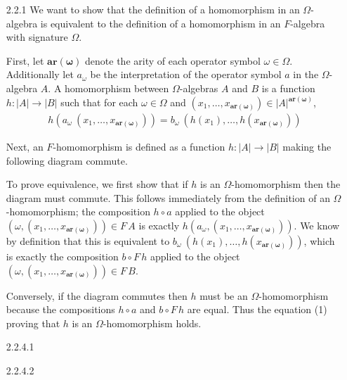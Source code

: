 \documentclass{article}
\newcommand{\carrier}[1]{|#1|}
\newcommand{\ar}[1]{\mathbf{ar(#1)}}
\begin{document}
\begin{enumerate}
\item [2.2.1]
  We want to show that the definition of a homomorphism in an $\Omega$-algebra is equivalent to the definition of a homomorphism in an $F$-algebra with signature $\Omega$.
  
  First, let $\ar{\omega}$ denote the arity of each operator symbol $\omega \in \Omega$.
  Additionally let $a_\omega$ be the interpretation of the operator symbol $a$ in the $\Omega$-algebra $A$.
  A homomorphism between $\Omega$-algebras $A$ and $B$ is a function $h : \carrier{A} \rightarrow \carrier{B}$ such that for each $\omega \in \Omega$ and $(x_1,\ldots,x_{\ar{\omega}}) \in \carrier{A}^{\ar{\omega}}$,
  \begin{align}
    h(a_\omega~(x_1,\ldots,x_{\ar{\omega}})) = b_\omega~(h(x_1),\ldots,h(x_{\ar{\omega}}))
  \end{align}

  Next, an $F$-homomorphism is defined as a function $h : \carrier{A} \rightarrow\carrier{B}$ making the following diagram commute.
  \begin{center}
  \end{center}

  To prove equivalence, we first show that if $h$ is an $\Omega$-homomorphism then the diagram must commute.
  This follows immediately from the definition of an $\Omega$-homomorphism; the composition $h \circ a$ applied to the object $(\omega, (x_1,\ldots,x_{\ar{\omega}})) \in F\,A$ is exactly $h(a_\omega, (x_1,\ldots,x_{\ar{\omega}}))$.
  We know by definition that this is equivalent to $b_\omega~(h(x_1),\ldots,h(x_{\ar{\omega}}))$, which is exactly the composition $b \circ F\,h$ applied to the object $(\omega, (x_1,\ldots,x_{\ar{\omega}})) \in F\,B$.

  Conversely, if the diagram commutes then $h$ must be an $\Omega$-homomorphism because the compositions $h \circ a$ and $b \circ F\,h$ are equal.
  Thus the equation (1) proving that $h$ is an $\Omega$-homomorphism holds.
\item[]
\item [2.2.4.1]
\item [2.2.4.2]
\end{enumerate}
\end{document}
